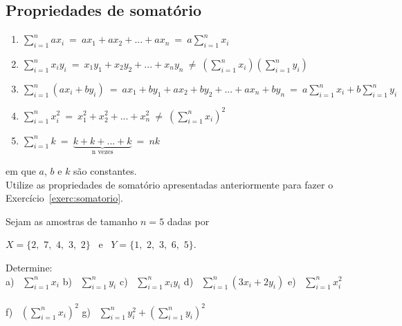 \documentclass[11pt,fleqn]{book} %
\begin{document}
\subsection{Propriedades de somatório}
\vspace{0,3cm}

\begin{enumerate}[label=\alph*)]
	\item $\displaystyle \sum_{i=1}^{n}{ax_i} \ = \ ax_1+ax_2+...+ax_n \ = \ a\displaystyle \sum_{i=1}^{n}x_i $
	
	\item $\displaystyle \sum_{i=1}^{n}{x_i y_i} \ = \ x_1 y_1+x_2 y_2+...+x_n y_n \ {\neq} \ 
	\left(\sum_{i=1}^{n}x_i\right) \left(\sum_{i=1}^{n}y_i\right) $
	
	\item $\displaystyle \sum_{i=1}^{n}{\left( ax_i+by_i \right)} \ = \ ax_1+by_1+ax_2+by_2+...+ax_n+by_n  \ = \ 
	a\sum_{i=1}^{n}x_i + b\sum_{i=1}^{n}y_i $
	
	\item $\displaystyle \sum_{i=1}^{n}{x_i^2} \ = \ x_1^2+x_2^2+...+x_n^2 \ {\neq} \ 
	\left(\sum_{i=1}^{n}x_i\right)^2 $
	
	\item $\displaystyle \sum_{i=1}^{n}k \ = \ \underbrace{k+k+...+k}_{\mbox{n vezes}} \ = \ nk $\\
	
\end{enumerate}

em que $a$, $b$ e $k$ são constantes.\\


Utilize as propriedades de somatório apresentadas anteriormente para fazer o Exercício~\ref{exerc:somatorio}. \\


\begin{exercise} \label{exerc:somatorio}
	Sejam as amostras de tamanho $n=5$ dadas por 

	\begin{center}
	$X=\{2,\,\, 7,\,\, 4,\,\, 3,\,\, 2\}$ \, e \, $Y=\{1,\,\, 2,\,\, 3,\,\, 6,\,\, 5\}$.
	\end{center}	
	
	Determine: \\
	
	\noindent \hspace{0.4cm} a) \, $\displaystyle \sum_{i=1}^{n}{x_i}$ 
	                  \qquad b) \, $\displaystyle \sum_{i=1}^{n}{y_i}$ 
	                  \qquad c) \, $\displaystyle \sum_{i=1}^{n}{x_i y_i}$ 
	                  \qquad d) \, $\displaystyle \sum_{i=1}^{n}{(3x_i+2y_i)}$ 
	                  \qquad e) \, $\displaystyle \sum_{i=1}^{n}{x_i^2}$ \\ \\
	                  
	\noindent \hspace{0.4cm} f) \, $\displaystyle \left(\sum_{i=1}^{n}{x_i}\right)^2$ 
	                  \qquad g) \, $\displaystyle \sum_{i=1}^{n}{y_i^2}+\left(\sum_{i=1}^{n}{y_i}\right)^2$
	 
\end{exercise}
\vspace{0.3cm}
\end{document}
